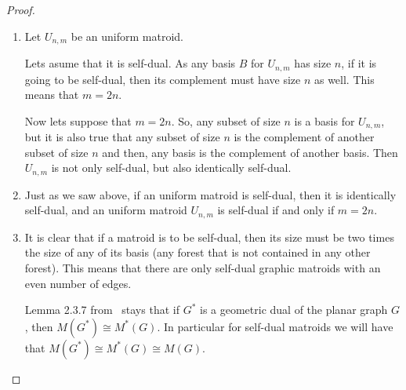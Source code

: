 \begin{proof}$\,$\pn
    \begin{enumerate}[label=(\roman*)]
        \item 
            Let $U_{n,m}$ be an uniform matroid.\pn
            
            Lets asume that it is self-dual. As
            any basis $B$ for $U_{n,m}$ has size $n$, if it is going to be self-dual,
            then its complement must have size $n$ as well. This means that $m = 2n$.\pn
            
            Now lets suppose that $m = 2n$. So, any subset of size $n$ is a basis for $U_{n,m}$,
            but it is also true that any subset of size $n$ is the complement of another subset
            of size $n$ and then, any basis is the complement of another basis. Then $U_{n,m}$ is
            not only self-dual, but also identically self-dual.
        \item 
            Just as we saw above, if an uniform matroid is self-dual, then it is identically self-dual, and
            an uniform matroid $U_{n,m}$ is self-dual if and only if $m = 2n$.
            
        \item 
            It is clear that if a matroid is to be self-dual, then its size must be two times
            the size of any of its basis (any forest that is not contained in any other forest). 
            This means that there are only self-dual graphic matroids with an even number of edges. \pn
            
            Lemma 2.3.7 from~\cite{Oxley} stays that if $G^*$ is a geometric dual of the planar graph $G$, then
            $M(G^*) \cong M^*(G)$. In particular for self-dual matroids we will have that $M(G^*) \cong M^*(G) \cong M(G)$.
            

\end{enumerate}
\end{proof}

